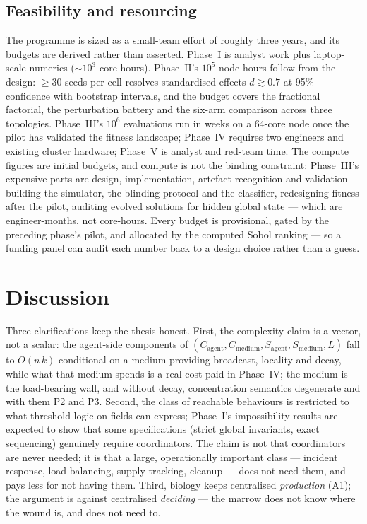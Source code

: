 \documentclass[twoside,twocolumn,usenatbib]{mnras}
\begin{document}
\subsection{Feasibility and resourcing}
\label{sec:feasibility}

The programme is sized as a small-team effort of roughly three years,
and its budgets are derived rather than asserted. Phase~I is analyst
work plus laptop-scale numerics ($\sim 10^3$ core-hours). Phase~II's
$10^5$ node-hours follow from the design: $\ge 30$ seeds per cell
resolves standardised effects $d \gtrsim 0.7$ at 95\% confidence with
bootstrap intervals, and the budget covers the fractional factorial,
the perturbation battery and the six-arm comparison across three
topologies. Phase~III's $10^6$ evaluations run in weeks on a 64-core
node once the pilot has validated the fitness landscape; Phase~IV
requires two engineers and existing cluster hardware; Phase~V is
analyst and red-team time. The compute figures are initial budgets,
and compute is not the binding constraint: Phase~III's expensive parts
are design, implementation, artefact recognition and validation ---
building the simulator, the blinding protocol and the classifier,
redesigning fitness after the pilot, auditing evolved solutions for
hidden global state --- which are engineer-months, not core-hours.
Every budget is provisional, gated by the
preceding phase's pilot, and allocated by the computed Sobol ranking
--- so a funding panel can audit each number back to a design choice
rather than a guess.

\section{Discussion}
\label{sec:discussion}

Three clarifications keep the thesis honest. First, the complexity
claim is a vector, not a scalar: the agent-side components of
$(C_{\mathrm{agent}}, C_{\mathrm{medium}}, S_{\mathrm{agent}},
S_{\mathrm{medium}}, L)$ fall to $O(n\,k)$ conditional on
a medium providing broadcast, locality and decay, while what that
medium spends is a real cost
paid in Phase~IV; the medium is the load-bearing wall, and without
decay, concentration semantics degenerate and with them P2 and P3. Second, the class of reachable
behaviours is restricted to what threshold logic on fields can
express; Phase~I's impossibility results are expected to show that
some specifications (strict global invariants, exact sequencing)
genuinely require coordinators. The claim is not that coordinators are
never needed; it is that a large, operationally important class ---
incident response, load balancing, supply tracking,
cleanup --- does not need them, and pays less for not having them.
Third, biology keeps centralised \emph{production} (A1); the argument
is against centralised \emph{deciding} --- the marrow does not know
where the wound is, and does not need to.
\end{document}
